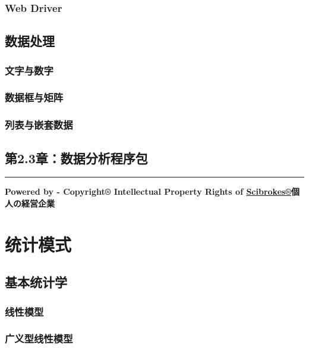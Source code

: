 \documentclass[]{book}
\theoremstyle{definition}
\theoremstyle{definition}
\theoremstyle{definition}
\theoremstyle{remark}
\begin{document}
\hypertarget{web-driver}{%
\subsection{Web Driver}\label{web-driver}}

\section{数据处理}

\subsection{文字与数字}

\subsection{数据框与矩阵}

\subsection{列表与嵌套数据}

\hypertarget{2.3}{%
\section{第2.3章：数据分析程序包}\label{2.3}}

\begin{center}\rule{0.5\linewidth}{\linethickness}\end{center}

\textbf{Powered by - Copyright® Intellectual Property Rights of
\href{http://www.scibrokes.com}{Scibrokes®}個人の経営企業}

\hypertarget{stats}{%
\chapter{统计模式}\label{stats}}

\section{基本统计学}

\subsection{线性模型}

\subsection{广义型线性模型}
\end{document}
